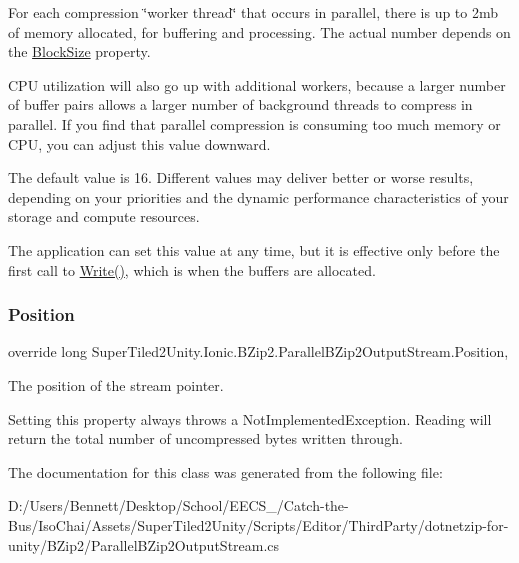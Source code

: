 For each compression \char`\"{}worker thread\char`\"{} that occurs in parallel, there is up to 2mb of memory allocated, for buffering and processing. The actual number depends on the \mbox{\hyperlink{class_super_tiled2_unity_1_1_ionic_1_1_b_zip2_1_1_parallel_b_zip2_output_stream_ad5587967d735034948f62bce57095077}{Block\+Size}} property. 

C\+PU utilization will also go up with additional workers, because a larger number of buffer pairs allows a larger number of background threads to compress in parallel. If you find that parallel compression is consuming too much memory or C\+PU, you can adjust this value downward. 

The default value is 16. Different values may deliver better or worse results, depending on your priorities and the dynamic performance characteristics of your storage and compute resources. 

The application can set this value at any time, but it is effective only before the first call to \mbox{\hyperlink{class_super_tiled2_unity_1_1_ionic_1_1_b_zip2_1_1_parallel_b_zip2_output_stream_a35ba7da75cc82ea269449f9497e3e148}{Write()}}, which is when the buffers are allocated. \mbox{\label{class_super_tiled2_unity_1_1_ionic_1_1_b_zip2_1_1_parallel_b_zip2_output_stream_aa760b87a6e97249f9eebbf4fcc23bea9}} 
\subsubsection{\texorpdfstring{Position}{Position}}
{\footnotesize\ttfamily override long Super\+Tiled2\+Unity.\+Ionic.\+B\+Zip2.\+Parallel\+B\+Zip2\+Output\+Stream.\+Position\hspace{0.3cm}{\ttfamily [get]}, {\ttfamily [set]}}



The position of the stream pointer. 

Setting this property always throws a Not\+Implemented\+Exception. Reading will return the total number of uncompressed bytes written through. 

The documentation for this class was generated from the following file\+:\begin{DoxyCompactItemize}
\item 
D\+:/\+Users/\+Bennett/\+Desktop/\+School/\+E\+E\+C\+S\+\_/\+Catch-\/the-\/\+Bus/\+Iso\+Chai/\+Assets/\+Super\+Tiled2\+Unity/\+Scripts/\+Editor/\+Third\+Party/dotnetzip-\/for-\/unity/\+B\+Zip2/Parallel\+B\+Zip2\+Output\+Stream.\+cs\end{DoxyCompactItemize}
